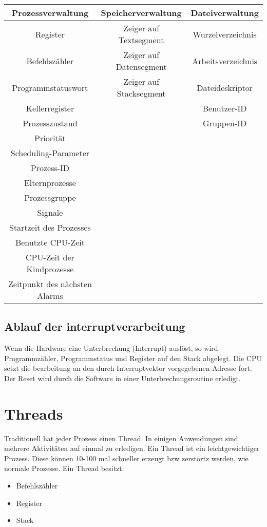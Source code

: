 \begin{tabular}{ | c | c | c | }
    \hline
    Prozessverwaltung & Speicherverwaltung & Dateiverwaltung \\\hline 
    Register & Zeiger auf Textsegment & Wurzelverzeichnis \\
    Befehlszähler & Zeiger auf Datensegment & Arbeitsverzeichnis \\
    Programmstatuswort & Zeiger auf Stacksegment & Dateideskriptor \\
    Kellerregister & & Benutzer-ID \\
    Prozesszustand & & Gruppen-ID \\
    Priorität & &\\
    Scheduling-Parameter & &\\
    Prozess-ID & &\\
    Elternprozesse & &\\
    Prozessgruppe & &\\
    Signale & &\\
    Startzeit des Prozesses & &\\
    Benutzte CPU-Zeit & &\\
    CPU-Zeit der Kindprozesse & &\\
    Zeitpunkt des nächsten Alarms & & \\ \hline
\end{tabular}

\subsection{Ablauf der interruptverarbeitung}

Wenn die Hardware eine Unterbrechung (Interrupt) auslöst, so wird Programmzähler, Programmstatus und Register auf den Stack abgelegt. Die CPU setzt die bearbeitung an den durch Interruptvektor vorgegebenen Adresse fort. Der Reset wird durch die Software in einer Unterbrechungsroutine erledigt. 

\section{Threads}

Traditionell hat jeder Prozess einen Thread. In einigen Anwendungen sind mehrere Aktivitäten auf einmal zu erledigen. Ein Thread ist ein leichtgewichtiger Prozess. Diese können 10-100 mal schneller erzeugt bzw zerstörtz werden, wie normale Prozesse. Ein Thread besitzt:

\begin{itemize}
    \item Befehlszähler
    \item Register
    \item Stack
\end{itemize}

